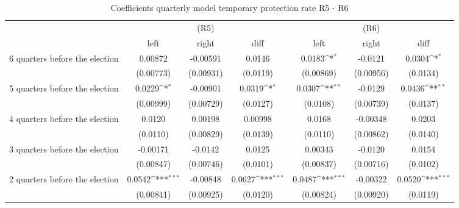 \begin{table}[!ht]\centering \footnotesize
\def\sym#1{\ifmmode^{#1}\else\(^{#1}\)\fi}
\caption{Coefficients quarterly model temporary protection rate R5 - R6}
\begin{tabular}{l*{6}{c}}
\hline\hline
                    &\multicolumn{3}{c}{(R5)}&\multicolumn{3}{c}{(R6)}\\
&\multicolumn{1}{c}{left}&\multicolumn{1}{c}{right}&\multicolumn{1}{c}{diff}&\multicolumn{1}{c}{left}&\multicolumn{1}{c}{right}&\multicolumn{1}{c}{diff}\\
\hline
 6 quarters before the election&     0.00872         &    -0.00591         &      0.0146         &      0.0183\sym{*}  &     -0.0121         &      0.0304\sym{*}  \\
                    &   (0.00773)         &   (0.00931)         &    (0.0119)         &   (0.00869)         &   (0.00956)         &    (0.0134)         \\
[0,5em]
 5 quarters before the election&      0.0229\sym{*}  &    -0.00901         &      0.0319\sym{*}  &      0.0307\sym{**} &     -0.0129         &      0.0436\sym{**} \\
                    &   (0.00999)         &   (0.00729)         &    (0.0127)         &    (0.0108)         &   (0.00739)         &    (0.0137)         \\
[0,5em]
 4 quarters before the election&      0.0120         &     0.00198         &     0.00998         &      0.0168         &    -0.00348         &      0.0203         \\
                    &    (0.0110)         &   (0.00829)         &    (0.0139)         &    (0.0110)         &   (0.00862)         &    (0.0140)         \\
[0,5em]
 3 quarters before the election&    -0.00171         &     -0.0142         &      0.0125         &     0.00343         &     -0.0120         &      0.0154         \\
                    &   (0.00847)         &   (0.00746)         &    (0.0101)         &   (0.00837)         &   (0.00716)         &    (0.0102)         \\
[0,5em]
 2 quarters before the election&      0.0542\sym{***}&    -0.00848         &      0.0627\sym{***}&      0.0487\sym{***}&    -0.00322         &      0.0520\sym{***}\\
                    &   (0.00841)         &   (0.00925)         &    (0.0120)         &   (0.00824)         &   (0.00920)         &    (0.0119)         \\

\end{tabular}
\end{table}
